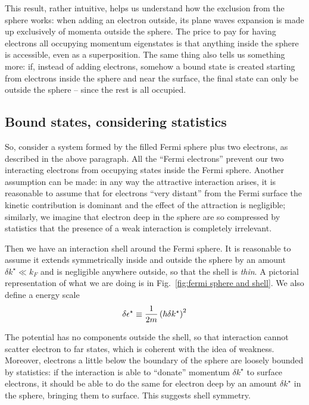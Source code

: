 This result, rather intuitive, helps us understand how the exclusion from the sphere works: when adding an electron outside, its plane waves expansion is made up exclusively of momenta outside the sphere. The price to pay for having electrons all occupying momentum eigenstates is that anything inside the sphere is accessible, even as a superposition. The same thing also tells us something more: if, instead of adding electrons, somehow a bound state is created starting from electrons inside the sphere and near the surface, the final state can only be outside the sphere -- since the rest is all occupied.

\subsection{Bound states, considering statistics}\label{subsec:bound states, considering statistics}

So, consider a system formed by the filled Fermi sphere plus two electrons, as described in the above paragraph. All the ``Fermi electrons'' prevent our two interacting electrons from occupying states inside the Fermi sphere. Another assumption can be made: in any way the attractive interaction arises, it is reasonable to assume that for electrons ``very distant'' from the Fermi surface the kinetic contribution is dominant and the effect of the attraction is negligible; similarly, we imagine that electron deep in the sphere are so compressed by statistics that the presence of a weak interaction is completely irrelevant.

Then we have an interaction shell around the Fermi sphere. It is reasonable to assume it extends symmetrically inside and outside the sphere by an amount $\delta k^\star \ll k_F$ and is negligible anywhere outside, so that the shell is \textit{thin}. A pictorial representation of what we are doing is in Fig.~\ref{fig:fermi sphere and shell}. We also define a energy scale
\[
	\delta\epsilon^\star \equiv \frac{1}{2m} \left({\hbar \delta k^\star}\right)^2
\]

The potential has no components outside the shell, so that interaction cannot scatter electron to far states, which is coherent with the idea of weakness. Moreover, electrons a little below the boundary of the sphere are loosely bounded by statistics: if the interaction is able to ``donate'' momentum $\delta k^\star$ to surface electrons, it should be able to do the same for electron deep by an amount $\delta k^\star$ in the sphere, bringing them to surface. This suggests shell symmetry.

